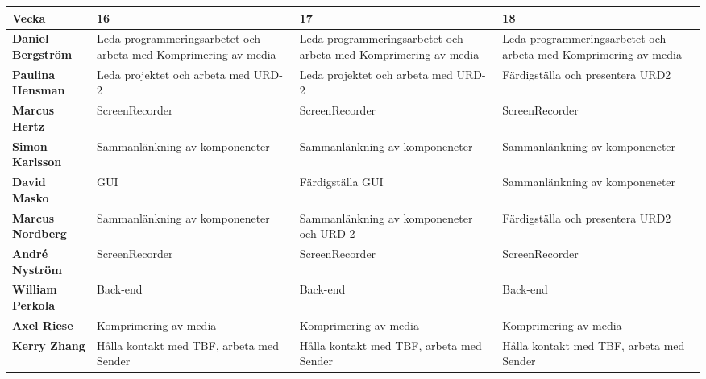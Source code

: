 \begin{tabular}{ | p{100pt} || p{100pt} | p{100pt} | p{100pt} |}
  \hline
  \textbf{Vecka} & 16 & 17 & 18\\ \hline
  \textbf{Daniel Bergström} & Leda programmeringsarbetet och arbeta med Komprimering av media & Leda programmeringsarbetet och arbeta med Komprimering av media & Leda programmeringsarbetet och arbeta med Komprimering av media\\ \hline
  \textbf{Paulina Hensman} & Leda projektet och arbeta med URD-2 & Leda projektet och arbeta med URD-2 & Färdigställa och presentera URD2\\ \hline
  \textbf{Marcus Hertz} & ScreenRecorder & ScreenRecorder & ScreenRecorder \\ \hline
  \textbf{Simon Karlsson} & Sammanlänkning av komponeneter & Sammanlänkning av komponeneter & Sammanlänkning av komponeneter\\ \hline
  \textbf{David Masko} & GUI & Färdigställa GUI & Sammanlänkning av komponeneter\\ \hline
  \textbf{Marcus Nordberg} & Sammanlänkning av komponeneter & Sammanlänkning av komponeneter och URD-2 & Färdigställa och presentera URD2\\ \hline
  \textbf{André Nyström} & ScreenRecorder & ScreenRecorder & ScreenRecorder\\ \hline
  \textbf{William Perkola} & Back-end & Back-end & Back-end\\ \hline
  \textbf{Axel Riese} & Komprimering av media & Komprimering av media & Komprimering av media\\ \hline
  \textbf{Kerry Zhang} & Hålla kontakt med TBF, arbeta med Sender & Hålla kontakt med TBF, arbeta med Sender & Hålla kontakt med TBF, arbeta med Sender \\ \hline
\end{tabular}


